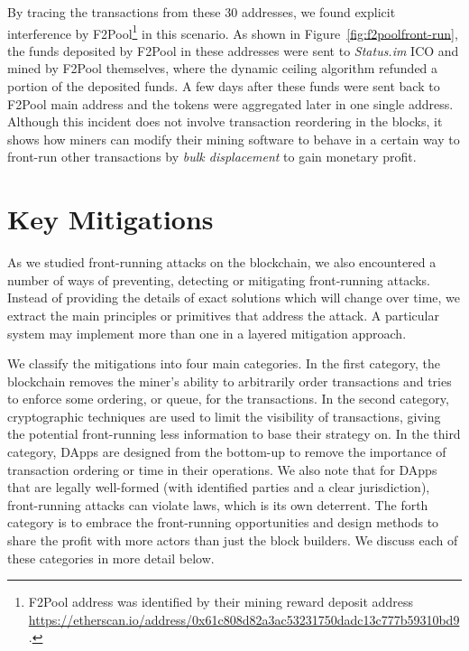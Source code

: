 
By tracing the transactions from these 30 addresses, we found explicit interference by F2Pool\footnote{F2Pool address was identified by their mining reward deposit address \url{https://etherscan.io/address/0x61c808d82a3ac53231750dadc13c777b59310bd9}.} in this scenario. As shown in Figure~\ref{fig:f2poolfront-run}, the funds deposited by F2Pool in these addresses were sent to \textit{Status.im} ICO and mined by F2Pool themselves, where the dynamic ceiling algorithm refunded a portion of the deposited funds. A few days after these funds were sent back to F2Pool main address and the tokens were aggregated later in one single address. Although this incident does not involve transaction reordering in the blocks, it shows how miners can modify their mining software to behave in a certain way to front-run other transactions by \textit{bulk displacement} to gain monetary profit.




\section{Key Mitigations} %




As we studied front-running attacks on the blockchain, we also encountered a number of ways of preventing, detecting or mitigating front-running attacks. Instead of providing the details of exact solutions which will change over time, we extract the main principles or primitives that address the attack. A particular system may implement more than one in a layered mitigation approach.

We classify the mitigations into four main categories. In the first category, the blockchain removes the miner's ability to arbitrarily order transactions and tries to enforce some ordering, or queue, for the transactions. In the second category, cryptographic techniques are used to limit the visibility of transactions, giving the potential front-running less information to base their strategy on. In the third category, DApps are designed from the bottom-up to remove the importance of transaction ordering or time in their operations. We also note that for DApps that are legally well-formed (\eg with identified parties and a clear jurisdiction), front-running attacks can violate laws, which is its own deterrent. The forth category is to embrace the front-running opportunities and design methods to share the profit with more actors than just the block builders. We discuss each of these categories in more detail below.

